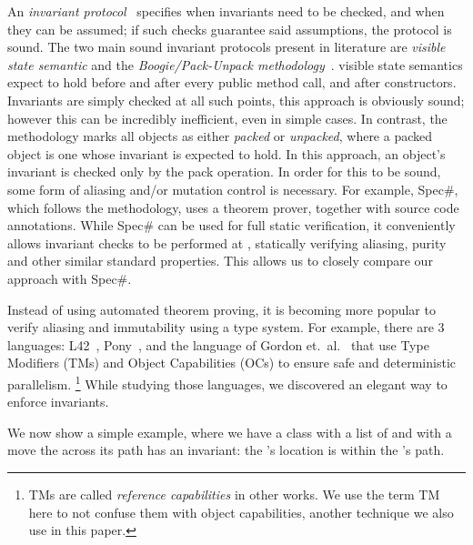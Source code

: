 An \emph{invariant protocol}~\cite{FlexibleInvariants} specifies when invariants need to be checked, and when they can be assumed; if such checks guarantee said assumptions, the protocol is sound.
The two main sound invariant protocols present in literature are \emph{visible state semantic} \cite{Meyer:1988:OSC:534929} and the \emph{Boogie/Pack-Unpack methodology}~\cite{DBLP:journals/jot/BarnettDFLS04}. visible state semantics expect  to hold before and after every public method call, and after constructors. Invariants are simply checked at all such points,  this approach is obviously sound; however this can be incredibly inefficient, even in simple cases.
In contrast, the  methodology marks all objects as either \emph{packed} or \emph{unpacked}, where a packed object is one whose invariant is expected to hold.
In this approach, an object's invariant is checked only by the pack operation.
In order for this to be sound, some form of aliasing and/or mutation control is necessary. For example, Spec\#, which follows the  methodology, uses a theorem prover, together with source code annotations.
While Spec\# can be used for full static verification, it conveniently allows invariant checks to be performed
at , 
 statically verifying aliasing, purity and other similar standard properties.
This allows us to closely compare our approach with Spec\#.

Instead of using automated theorem proving, 
it is becoming more popular to verify aliasing and immutability using a type system.
For example, there are 3 languages: L42~\cite{ServettoZucca15,ServettoEtAl13a,JOT:issue_2011_01/article1,GianniniEtAl16}, Pony~\cite{clebsch2015deny,clebsch2017orca}, and the language of Gordon et.~al.~\cite{GordonEtAl12} that use Type Modifiers (TMs) and Object Capabilities (OCs) to ensure safe and deterministic parallelism.%
\footnote{TMs are called \emph{reference capabilities} in other works. We use the term TM here
to not confuse them with object capabilities, another technique we also use in this paper.}
While studying those languages, we discovered an elegant way to enforce invariants.


We now show a simple example, where we have a \Q@Cage@ class with a list of \IO{\Q@Point@s, \Q@path@,} and \Q@Hamster@ with a \IO{\Q@Point@,} \Q@pos@{} \Q@Cage@ {} move the \Q@Hamster@ across its path has an invariant: the \Q@Hamster@'s location is within the \Q@Cage@'s path.

